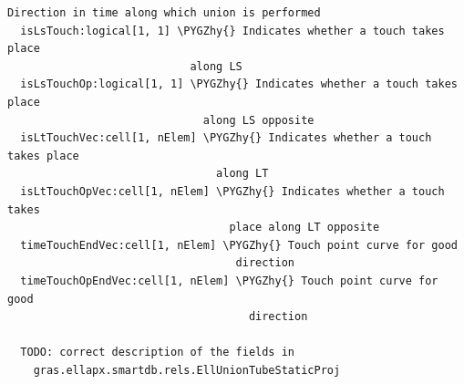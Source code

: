 \documentclass[letterpaper,10pt,english]{sphinxmanual}
\def\PYGZhy{\char`\-}
\begin{document}
\begin{Verbatim}[commandchars=\\\{\}]
                     Direction in time along which union is performed
  isLsTouch:logical[1, 1] \PYGZhy{} Indicates whether a touch takes place
                            along LS
  isLsTouchOp:logical[1, 1] \PYGZhy{} Indicates whether a touch takes place
                              along LS opposite
  isLtTouchVec:cell[1, nElem] \PYGZhy{} Indicates whether a touch takes place
                                along LT
  isLtTouchOpVec:cell[1, nElem] \PYGZhy{} Indicates whether a touch takes
                                  place along LT opposite
  timeTouchEndVec:cell[1, nElem] \PYGZhy{} Touch point curve for good
                                   direction
  timeTouchOpEndVec:cell[1, nElem] \PYGZhy{} Touch point curve for good
                                     direction

  TODO: correct description of the fields in
    gras.ellapx.smartdb.rels.EllUnionTubeStaticProj
\end{Verbatim}
\end{document}
